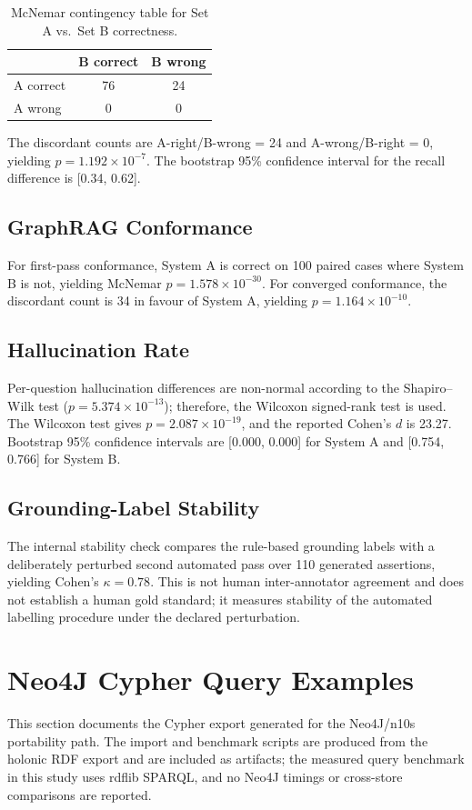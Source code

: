 \documentclass[10pt,a4paper]{article}
\begin{document}
\begin{table}[H]
\centering
\caption{McNemar contingency table for Set A vs.\ Set B correctness.}
\label{tab:mcnemar_shacl}
\small
\begin{tabular}{lcc}
\toprule
 & \textbf{B correct} & \textbf{B wrong} \\
\midrule
A correct & 76 & 24 \\
A wrong & 0 & 0 \\
\bottomrule
\end{tabular}
\end{table}

The discordant counts are A-right/B-wrong = 24 and A-wrong/B-right = 0, yielding \(p=1.192\times10^{-7}\). The bootstrap 95\% confidence interval for the recall difference is [0.34, 0.62].

\subsection{GraphRAG Conformance}
For first-pass conformance, System A is correct on 100 paired cases where System B is not, yielding McNemar \(p=1.578\times10^{-30}\). For converged conformance, the discordant count is 34 in favour of System A, yielding \(p=1.164\times10^{-10}\).

\subsection{Hallucination Rate}
Per-question hallucination differences are non-normal according to the Shapiro--Wilk test (\(p=5.374\times10^{-13}\)); therefore, the Wilcoxon signed-rank test is used. The Wilcoxon test gives \(p=2.087\times10^{-19}\), and the reported Cohen's \(d\) is 23.27. Bootstrap 95\% confidence intervals are [0.000, 0.000] for System A and [0.754, 0.766] for System B.

\subsection{Grounding-Label Stability}
The internal stability check compares the rule-based grounding labels with a deliberately perturbed second automated pass over 110 generated assertions, yielding Cohen's \(\kappa=0.78\). This is not human inter-annotator agreement and does not establish a human gold standard; it measures stability of the automated labelling procedure under the declared perturbation.

\section{Neo4J Cypher Query Examples}
\label{sec:neo4j}
This section documents the Cypher export generated for the Neo4J/n10s portability path. The import and benchmark scripts are produced from the holonic RDF export and are included as artifacts; the measured query benchmark in this study uses rdflib SPARQL, and no Neo4J timings or cross-store comparisons are reported.
\end{document}
